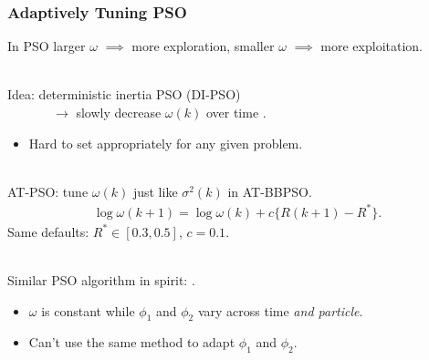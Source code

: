\documentclass[xcolor=dvipsnames]{beamer}
\begin{document}
\begin{frame}
\frametitle{Adaptively Tuning PSO}
In PSO larger $\omega$ $\implies$ more exploration, smaller $\omega$ $\implies$ more exploitation.\\~\\

\pause

Idea: deterministic inertia PSO (DI-PSO) \\
\ \ \ \ \ \ \ $\to$ slowly decrease $\omega(k)$ over time \citep{eberhart2000comparing}.
\begin{itemize}
\item Hard to set appropriately for any given problem.\\~\\
\end{itemize}

\pause

 AT-PSO: tune $\omega(k)$ just like $\sigma^2(k)$ in AT-BBPSO.
\begin{align*}
\log\omega(k+1) = \log\omega(k) + c\{R(k+1) - R^*\}.
\end{align*}
\pause
Same defaults: $R^*\in[0.3, 0.5]$, $c = 0.1$.\\~\\

\pause

Similar PSO algorithm in spirit: \cite{zhang2003adaptive}.
\begin{itemize}
\item $\omega$ is constant while $\phi_1$ and $\phi_2$ vary across time {\color{red}\emph{and particle}}.
\item Can't use the same method to adapt $\phi_1$ and $\phi_2$.
\end{itemize}
\end{frame}
\end{document}
